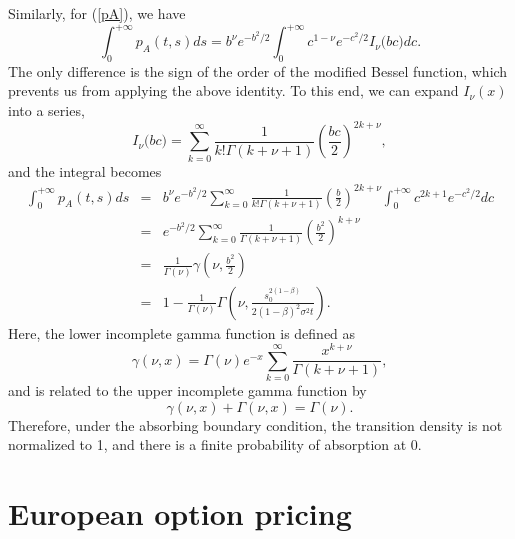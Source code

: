 \documentclass[12pt]{article}
\begin{document}
  Similarly, for (\ref{pA}), we have
  \begin{equation}
    \int_0^{+\infty}p_A(t,s)ds = b^{\nu}e^{-b^2/2}\int_0^{+\infty}c^{1-\nu}e^{-c^2/2}I_{\nu}\bigg(bc\bigg)dc.
  \end{equation}
  The only difference is the sign of the order of the modified Bessel function, which prevents us from applying the above identity.
  To this end, we can expand $I_{\nu}(x)$ into a series,
  \begin{equation}
    I_{\nu}\bigg(bc\bigg)=\sum_{k=0}^{\infty}\frac{1}{k!\Gamma\left(k+\nu+1\right)}\left(\frac{bc}{2}\right)^{2k+\nu},
  \end{equation}
  and the integral becomes
  \begin{eqnarray}
    \int_0^{+\infty}p_A(t,s)ds &=& b^{\nu}e^{-b^2/2}\sum_{k=0}^{\infty}\frac{1}{k!\Gamma\left(k+\nu+1\right)}\left(\frac{b}{2}\right)^{2k+\nu}
                                   \int_0^{+\infty}c^{2k+1}e^{-c^2/2}dc \nonumber\\
                               &=& e^{-b^2/2}\sum_{k=0}^{\infty}\frac{1}{\Gamma\left(k+\nu+1\right)}\left(\frac{b^2}{2}\right)^{k+\nu}\nonumber\\
                               &=& \frac{1}{\Gamma(\nu)}\gamma\left(\nu, \frac{b^2}{2}\right)\nonumber\\
                               &=& 1 - \frac{1}{\Gamma(\nu)}\Gamma\left(\nu, \frac{s_0^{2(1-\beta)}}{2(1-\beta)^2\sigma^2t}\right).
  \end{eqnarray}
  Here, the lower incomplete gamma function is defined as
  \begin{equation}
    \gamma(\nu,x) = \Gamma(\nu)e^{-x}\sum_{k=0}^{\infty}\frac{x^{k+\nu}}{\Gamma(k+\nu+1)},
  \end{equation}
  and is related to the upper incomplete gamma function by
  \begin{equation}
    \gamma(\nu,x) + \Gamma(\nu, x) = \Gamma(\nu).
  \end{equation}
  Therefore, under the absorbing boundary condition, the transition density is not normalized to 1, and there is a finite probability of
  absorption at 0.


\section{European option pricing}
\end{document}
